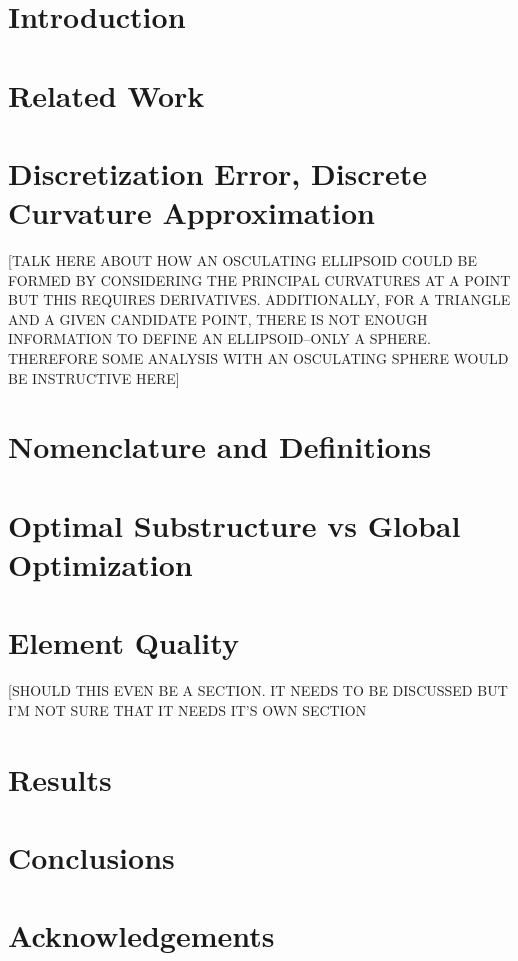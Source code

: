 \documentclass[11pt]{article}
\begin{document}
\section{Introduction}


\section{Related Work}

\section{Discretization Error, Discrete Curvature Approximation}
[TALK HERE ABOUT HOW AN OSCULATING ELLIPSOID COULD BE FORMED BY CONSIDERING THE PRINCIPAL CURVATURES AT A POINT BUT THIS REQUIRES DERIVATIVES. ADDITIONALLY, FOR A TRIANGLE AND A GIVEN CANDIDATE POINT, THERE IS NOT ENOUGH INFORMATION TO DEFINE AN ELLIPSOID--ONLY A SPHERE. THEREFORE SOME ANALYSIS WITH AN OSCULATING SPHERE WOULD BE INSTRUCTIVE HERE]

\section{Nomenclature and Definitions}


\section{Optimal Substructure vs Global Optimization}


\section{Element Quality}
[SHOULD THIS EVEN BE A SECTION. IT NEEDS TO BE DISCUSSED BUT I'M NOT
SURE THAT IT NEEDS IT'S OWN SECTION

\section{Results}

\section{Conclusions}

\section{Acknowledgements}



\end{document}
